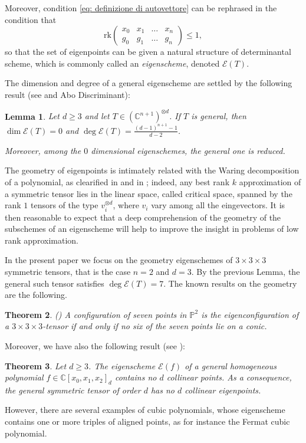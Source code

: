 \documentclass{amsart}
\theoremstyle{plain}
\newtheorem{lemma}{Lemma}[section]
\newtheorem{theorem}[lemma]{Theorem}
\theoremstyle{definition}
\newcommand{\C}{\mathbb{C}}
\newcommand{\p}{\mathbb{P}}
\newcommand{\Eig}[1]{\mathcal{E}\!\left( {#1} \right)}
\newcommand{\rk}{\ensuremath{\mathrm{rk}}}
\begin{document}
{Moreover, condition \eqref{eq: definizione di autovettore} can be rephrased in the condition that
\begin{equation}
\label{eq:def_matrix_general}
    \rk \begin{pmatrix}
    x_0 & x_1 & \dots & x_n \\
    g_0 & g_1 & \dots & g_n
    \end{pmatrix} \le 1,
\end{equation}
so that the set of eigenpoints can be given a natural structure of determinantal scheme, which is commonly called an \emph{eigenscheme}, denoted $\Eig{T}$.

The dimension and degree of a general eigenscheme are settled by the following result (see \cite[Theorem 2.1]{CartSturm} and Abo Discriminant):

\begin{lemma}\label{lem:nonempty}
Let $d\ge 3$ and let $T \in (\C^{n+1})^{\otimes d}$.
If $T$ is general, then $\dim \Eig{T}=0$ and $\deg \Eig{T}=\frac{(d-1)^{n+1}-1}{d-2}$.

  Moreover, among the $0$ dimensional eigenschemes, the general one is reduced.
\end{lemma}

The geometry of eigenpoints is intimately related with the Waring decomposition of a polynomial, 
as clearified
in \cite{DOT} and in \cite{Ott}; indeed, any best rank $k$ approximation of a symmetric tensor lies in the linear
space, called {critical space},  spanned by the rank $1$ tensors of the type $v_i ^{\otimes d}$, where $v_i$ vary among all the eingevectors. It is then reasonable to expect that a deep comprehension of the geometry of the subschemes of an eigenscheme will help to improve the insight in problems of low rank approximation.


 In the present paper we focus on the geometry eigenschemes of $3\times 3 \times 3$ symmetric tensors, that is the case $n=2$ and $d=3$. By the previous Lemma, the general such tensor
 satisfies $\deg \Eig{T}=7$. The known results on the geometry are the following.

\begin{theorem} (\cite[Theorem 5.1]{ASS})
A configuration of seven points in $\p^2$ is the eigenconfiguration
of a $3\times 3 \times 3$-tensor if and only if no six of the seven points lie on a conic.
\end{theorem}

Moreover, we have also the following result (see \cite[Theorem 5.7]{BGV}):
\begin{theorem}
\label{thm : general no d collinear}
Let $d\ge 3$. The eigenscheme $\Eig{f}$ of a general homogeneous polynomial $f \in \C[x_0,x_1,x_2]_d$ contains no $d$ collinear points. As a
consequence, the general symmetric tensor of order $d$ has no $d$ collinear eigenpoints.
\end{theorem}
}
However, there are several examples of cubic polynomials, whose eigenscheme contains one or more triples of aligned points, as for instance the Fermat cubic polynomial.
\end{document}
